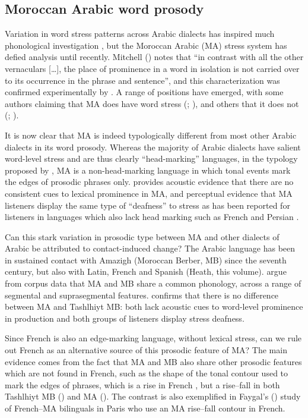 \documentclass[output=paper]{langsci/langscibook}
\begin{document}
 
 \subsection{Moroccan Arabic word prosody} \label{moroc}


Variation in word stress patterns across Arabic dialects has inspired much phonological investigation \citep{Watson2011stress}, but the Moroccan Arabic (MA) stress system has defied analysis until recently. Mitchell (\citeyear[202]{Mitchell1993}) notes that “in contrast with all the other vernaculars […], the place of prominence in a word in isolation is not carried over to its occurrence in the phrase and sentence”, and this characterization was confirmed experimentally by \citet{Boudlal2001}. A range of positions have emerged, with some authors claiming that MA does have word stress (\citealt{Benkirane1998}; \citealt{BurdinEtAl2014}), and others that it does not (\citealt{Maas2013}; \citealt{ElZarka2012}). 

It is now clear that MA is indeed typologically different from most other Arabic dialects in its word prosody. Whereas the majority of Arabic dialects have salient word-level stress and are thus clearly ``head-marking'' languages, in the typology proposed by \citet{Jun2005}, MA is a non-head-marking language in which tonal events mark the edges of prosodic phrases only. \citet{Bruggeman2018} provides acoustic evidence that there are no consistent cues to lexical prominence in MA, and perceptual evidence that MA listeners display the same type of ``deafness'' to stress as has been reported for listeners in languages which also lack head marking such as French \citep{DupouxPeperkamp2001} and Persian \citep{RahmaniRietveldGussenhoven2015}.

Can this stark variation in prosodic type between MA and other dialects of Arabic be attributed to contact-induced change? The Arabic language has been in sustained contact with Amazigh (Moroccan Berber, MB) since the seventh century, but also with Latin, French and Spanish (Heath, this volume). \citet{MaasProcházka2012} argue from corpus data that MA and MB share a common phonology, across a range of segmental and suprasegmental features. \citet{Bruggeman2018} confirms that there is no difference between MA and Tashlhiyt MB: both lack acoustic cues to word-level prominence in production and both groups of listeners display stress deafness. 

Since French is also an edge-marking language, without lexical stress, can we rule out French as an alternative source of this prosodic feature of MA? The main evidence comes from the fact that MA and MB also share other prosodic features which are not found in French, such as the shape of the tonal contour used to mark the edges of phrases, which is a rise in French \citep{Delais-Roussarieetal2015}, but a rise--fall in both Tashlhiyt MB (\citealt{GriceEtAl2015,BruggemanRoettgerGrice2017}) and MA (\citealt{Benkirane1998,Hellmuthtoappearbook}). The contrast is also exemplified in Faygal's (\citeyear{Fagyal2005}) study of French--MA bilinguals in Paris who use an MA rise--fall contour in French.  
\end{document}

